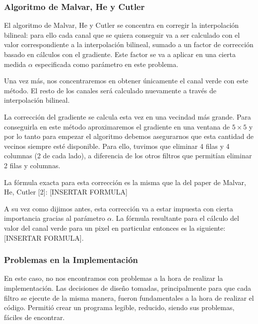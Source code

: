 \subsubsection{Algoritmo de Malvar, He y Cutler}

El algoritmo de Malvar, He y Cutler se concentra en corregir la interpolación bilineal: para ello cada canal que se quiera conseguir va a ser calculado con el valor correspondiente a la interpolación bilineal, sumado a un factor de corrección basado en cálculos con el gradiente. Este factor se va a aplicar en una cierta medida $\alpha$ especificada como parámetro en este problema.

\vspace{\baselineskip}

Una vez más, nos concentraremos en obtener únicamente el canal verde con este método. El resto de los canales será calculado nuevamente a través de  interpolación bilineal.

\vspace{\baselineskip}

La corrección del gradiente se calcula esta vez en una vecindad más grande. Para conseguirla en este método aproximaremos el gradiente en una ventana de $5 \times 5$  y por lo tanto para empezar el algoritmo debemos asegurarnos que esta cantidad de vecinos siempre esté disponible. Para ello, tuvimos que eliminar 4 filas y 4 columnas (2 de cada lado), a diferencia de los otros filtros que permitían eliminar 2 filas y columnas.

\vspace{\baselineskip}

La fórmula exacta para esta corrección es la misma que la del paper de Malvar, He, Cutler [2]: [INSERTAR FORMULA]

\vspace{\baselineskip}

A su vez como dijimos antes, esta corrección va a estar impuesta con cierta importancia gracias al parámetro $\alpha$. La fórmula resultante para el cálculo del valor del canal verde para un pixel en particular entonces es la siguiente: [INSERTAR FORMULA].




\subsubsection{Problemas en la Implementación}
En este caso, no nos encontramos con problemas a la hora de realizar la implementación. Las decisiones de diseño tomadas, principalmente para que cada filtro se ejecute de la misma manera, fueron fundamentales a la hora de realizar el código. Permitió crear un programa legible, reducido, siendo sus problemas, fáciles de encontrar.

